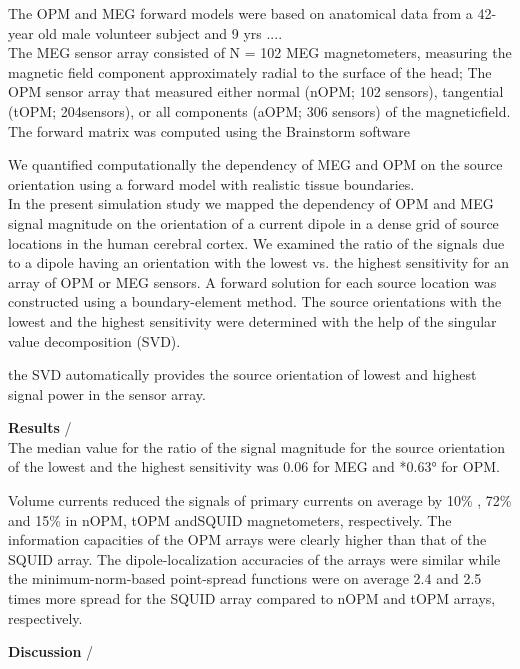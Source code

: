 \documentclass[a4paper]{article}
\begin{document}
The OPM and MEG forward models were based on anatomical data from a 42-year old male volunteer subject and 9 yrs ....\\

The MEG sensor array consisted of N = 102 MEG magnetometers, measuring the magnetic field component approximately radial to the surface of the head; The OPM sensor array that measured either normal (nOPM; 102 sensors), tangential (tOPM; 204sensors), or all components (aOPM; 306 sensors) of the magneticfield.\\

The forward matrix was computed using the Brainstorm software

We quantified computationally the dependency of MEG and OPM on the source orientation using a forward model with realistic tissue boundaries.\\

In the present simulation study we mapped the dependency of OPM and MEG signal magnitude on the orientation of a current dipole in a dense grid of source locations in the human cerebral cortex. We examined the ratio of the signals due to a dipole having an orientation with the lowest vs. the highest sensitivity for an array of OPM or MEG sensors. A forward solution for each source location was constructed using a boundary-element method. The source orientations with the lowest and the highest sensitivity were determined with the help of the singular value decomposition (SVD). 

the SVD automatically provides the source
orientation of lowest and highest signal power in the sensor
array.

\textbf{Results} /  \\

The median value for the ratio of the signal magnitude for the source orientation of the lowest and the highest sensitivity was 0.06 for MEG and *0.63° for OPM. 

 Volume currents reduced the signals of primary currents on average by 10\% , 72\% and 15\% in nOPM, tOPM andSQUID magnetometers, respectively. The information capacities of the OPM arrays were clearly higher than that of the SQUID array. The dipole-localization accuracies of the arrays were similar while the minimum-norm-based point-spread functions were on average 2.4 and 2.5 times more spread for the SQUID array compared to nOPM and tOPM arrays, respectively.

\textbf{ Discussion} / \\
\end{document}
